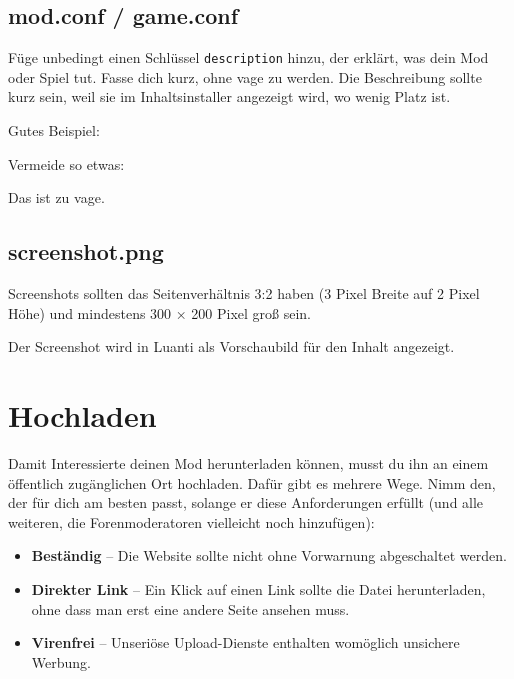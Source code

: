 \subsection{mod.conf / game.conf}\label{mod.conf-game.conf}

Füge unbedingt einen Schlüssel \texttt{description} hinzu, der erklärt,
was dein Mod oder Spiel tut. Fasse dich kurz, ohne vage zu werden. Die
Beschreibung sollte kurz sein, weil sie im Inhaltsinstaller angezeigt
wird, wo wenig Platz ist.

Gutes Beispiel:

\begin{Shaded}
\begin{Highlighting}[]
\end{Highlighting}
\end{Shaded}

Vermeide so etwas:

\begin{Shaded}
\begin{Highlighting}[]
\end{Highlighting}
\end{Shaded}

Das ist zu vage.

\subsection{screenshot.png}\label{screenshot.png}

Screenshots sollten das Seitenverhältnis 3:2 haben (3 Pixel Breite auf 2
Pixel Höhe) und mindestens 300 × 200 Pixel groß sein.

Der Screenshot wird in Luanti als Vorschaubild für den Inhalt angezeigt.

\section{Hochladen}\label{hochladen}

Damit Interessierte deinen Mod herunterladen können, musst du ihn an
einem öffentlich zugänglichen Ort hochladen. Dafür gibt es mehrere Wege.
Nimm den, der für dich am besten passt, solange er diese Anforderungen
erfüllt (und alle weiteren, die Forenmoderatoren vielleicht noch
hinzufügen):

\begin{itemize}
\tightlist
\item
  \textbf{Beständig} -- Die Website sollte nicht ohne Vorwarnung
  abgeschaltet werden.
\item
  \textbf{Direkter Link} -- Ein Klick auf einen Link sollte die Datei
  herunterladen, ohne dass man erst eine andere Seite ansehen muss.
\item
  \textbf{Virenfrei} -- Unseriöse Upload-Dienste enthalten womöglich
  unsichere Werbung.
\end{itemize}

